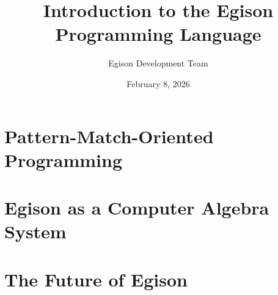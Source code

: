 \documentclass[a4paper,openany]{book}
\title{Introduction to the Egison Programming Language}
\author{Egison Development Team}
\date{February 8, 2026}
\theoremstyle{definition}
\begin{document}
\frontmatter

\maketitle

\setcounter{section}{0}
\setcounter{footnote}{0}


\tableofcontents

\mainmatter

\setcounter{section}{0}


\part{Pattern-Match-Oriented Programming}\label{part-pmo}











%





\part{Egison as a Computer Algebra System}\label{part-cas}













\part{The Future of Egison}



\appendix





%

%

\backmatter




\printindex
\end{document}
